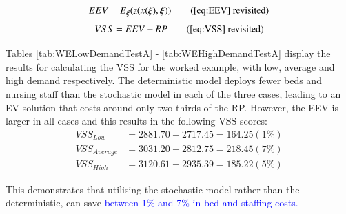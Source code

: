 \documentclass[../thesis.tex]{subfiles}
\begin{document}
{\begin{equation}
    EEV = E_{\boldsymbol{\xi}} (z(\bar x (\bar \xi),\boldsymbol{\xi})) \tag{\ref{eq:EEV} revisited}
\end{equation}
\begin{equation}
    VSS = EEV - RP\tag{\ref{eq:VSS} revisited}
\end{equation}

Tables \ref{tab:WELowDemandTestA} - \ref{tab:WEHighDemandTestA} display the results for calculating the VSS for the worked example, with low, average and high demand respectively. The deterministic model deploys fewer beds and nursing staff than the stochastic model in each of the three cases, leading to an EV solution that costs around only two-thirds of the RP. However, the EEV is larger in all cases and this results in the following VSS scores:
\begin{align}
    VSS_{Low} &= 2881.70 - 2717.45 = 164.25 (1\%)\\
    VSS_{Average} &= 3031.20 - 2812.75 = 218.45 (7\%)\\
    VSS_{High} &= 3120.61 - 2935.39 = 185.22 (5\%)
\end{align}

This demonstrates that utilising the stochastic model rather than the deterministic, can save \textcolor{blue}{between 1\% and 7\% in bed and staffing costs.}
\begin{table}[h!]
    \centering{}
    \caption{Low Demand Worked Example where results are recorded [(beds), (staff)] - Test A Results}
    \label{tab:WELowDemandTestA}
\end{table}

}
\end{document}

